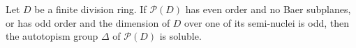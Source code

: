 Let $D$ be a finite division ring. If $\mathcal{P}(D)$ has even order and no Baer subplanes, or has odd order and the dimension of $D$ over one of its semi-nuclei is odd, then the autotopism group $\Delta$ of $\mathcal{P}(D)$ is soluble.
